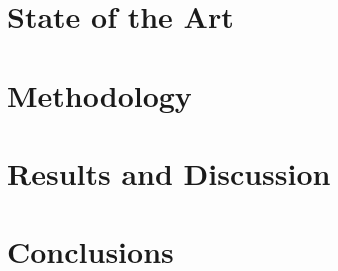 \documentclass[12pt, twoside]{book}
\begin{document}
\chapter{State of the Art}
\label{chap:state_of_art}


%

\chapter{Methodology}
\label{chap:methods}


\chapter{Results and Discussion}
\label{chap:results}



%


\chapter{Conclusions}
\label{chap:conclusions}





 
 

\appendix  
\clearpage %
\addappheadtotoc 
\appendixpage 


\end{document}
